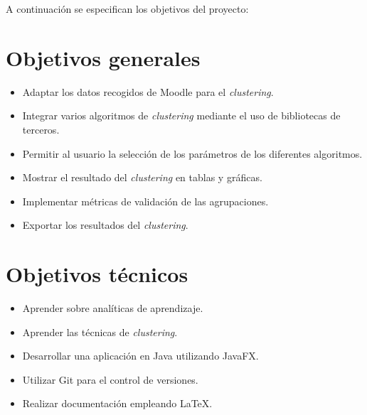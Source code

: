 A continuación se especifican los objetivos del proyecto:

\section{Objetivos generales}
\begin{itemize}
	\item Adaptar los datos recogidos de Moodle para el \emph{clustering}.
	\item Integrar varios algoritmos de \emph{clustering} mediante el uso de bibliotecas de terceros.
	\item Permitir al usuario la selección de los parámetros de los diferentes algoritmos.
	\item Mostrar el resultado del \emph{clustering} en tablas y gráficas.
	\item Implementar métricas de validación de las agrupaciones.
	\item Exportar los resultados del \emph{clustering}.
\end{itemize}

\section{Objetivos técnicos}
\begin{itemize}
	\item Aprender sobre analíticas de aprendizaje.
	\item Aprender las técnicas de \emph{clustering}.
	\item Desarrollar una aplicación en Java utilizando JavaFX.
	\item Utilizar Git para el control de versiones.
	\item Realizar documentación empleando \LaTeX.
\end{itemize}